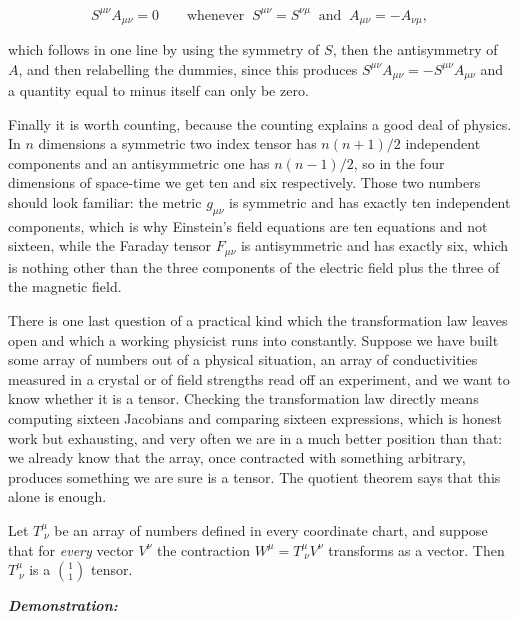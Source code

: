         \begin{equation}\label{eq:SymAntisym}
            S^{\mu\nu}A_{\mu\nu} = 0 \qquad \text{whenever} \;\; S^{\mu\nu} = S^{\nu\mu} \;\; \text{and} \;\; A_{\mu\nu} = -A_{\nu\mu},
        \end{equation}

        which follows in one line by using the symmetry of $S$, then the antisymmetry of $A$, and then relabelling the dummies, since this produces $S^{\mu\nu}A_{\mu\nu} = -S^{\mu\nu}A_{\mu\nu}$ and a quantity equal to minus itself can only be zero.

        Finally it is worth counting, because the counting explains a good deal of physics. In $n$ dimensions a symmetric two index tensor has $n(n+1)/2$ independent components and an antisymmetric one has $n(n-1)/2$, so in the four dimensions of space-time we get ten and six respectively. Those two numbers should look familiar: the metric $g_{\mu\nu}$ is symmetric and has exactly ten independent components, which is why Einstein's field equations are ten equations and not sixteen, while the Faraday tensor $F_{\mu\nu}$ is antisymmetric and has exactly six, which is nothing other than the three components of the electric field plus the three of the magnetic field.

        There is one last question of a practical kind which the transformation law leaves open and which a working physicist runs into constantly. Suppose we have built some array of numbers out of a physical situation, an array of conductivities measured in a crystal or of field strengths read off an experiment, and we want to know whether it is a tensor. Checking the transformation law directly means computing sixteen Jacobians and comparing sixteen expressions, which is honest work but exhausting, and very often we are in a much better position than that: we already know that the array, once contracted with something arbitrary, produces something we are sure is a tensor. The quotient theorem says that this alone is enough.

        \begin{myteo}
            Let $T^{\mu}_{\;\nu}$ be an array of numbers defined in every coordinate chart, and suppose that for \textit{every} vector $V^{\nu}$ the contraction $W^{\mu} = T^{\mu}_{\;\nu}V^{\nu}$ transforms as a vector. Then $T^{\mu}_{\;\nu}$ is a $\binom{1}{1}$ tensor.
        \end{myteo}

        \textbf{\textit{Demonstration:}}\\

